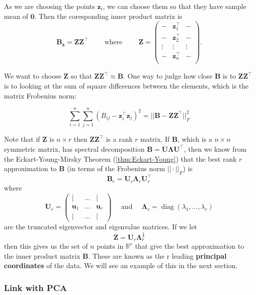 \documentclass[]{book}
\theoremstyle{definition}
\theoremstyle{definition}
\theoremstyle{definition}
\theoremstyle{remark}
\begin{document}
As we are choosing the points \(\mathbf z_i\), we can choose them so that they have sample mean of \(\boldsymbol 0\). Then the coresponding inner product matrix is
\[\mathbf B_\mathbf z= \mathbf Z\mathbf Z^\top \qquad \mbox{ where } \qquad \mathbf Z= 
\begin{pmatrix} - & \mathbf z_1^\top &-\\
 - & \mathbf z_2^\top& -\\
 \vdots & \vdots & \vdots\\
  - & \mathbf z_n^\top  &-\\
\end{pmatrix}.\]

We want to choose \(\mathbf Z\) so that \(\mathbf Z\mathbf Z^\top \approx \mathbf B\). One way to judge how close \(\mathbf B\) is to \(\mathbf Z\mathbf Z^\top\) is to looking at the sum of square differences between the elements, which is the matrix Frobenius norm:

\[\sum_{i=1}^n\sum_{j=1}^n (B_{ij}-\mathbf z_i^\top \mathbf z_j)^2 = ||\mathbf B- \mathbf Z\mathbf Z^\top||^2_F\]

Note that if \(\mathbf Z\) is \(n \times r\) then \(\mathbf Z\mathbf Z^\top\) is a rank \(r\) matrix. If \(\mathbf B\), which is a \(n\times n\) symmetric matrix, has spectral decomposition
\(\mathbf B= \mathbf U\boldsymbol \Lambda\mathbf U^\top\), then we know from the Eckart-Young-Mirsky Theorem (\ref{thm:Eckart-Young}) that the best rank \(r\) approximation to \(\mathbf B\) (in terms of the Frobenius norm \(||\cdot||_F\)) is
\[\mathbf B_r = \mathbf U_r \boldsymbol \Lambda_r \mathbf U_r^\top\]
where
\[\mathbf U_r = \begin{pmatrix} |&\ldots &|\\
\mathbf u_1 &\ldots & \mathbf u_r\\
|&\ldots &|\end{pmatrix} \quad\mbox{ and }\quad \boldsymbol \Lambda_r = \operatorname{diag}(\lambda_1, \ldots, \lambda_r)\]
are the truncated eigenvector and eigenvalue matrices.
If we let
\[\mathbf Z= \mathbf U_r \boldsymbol \Lambda_r^{\frac{1}{2}}\]
then this gives us the set of \(n\) points in \(\mathbb{R}^r\) that give the best approximation to the inner product matrix \(\mathbf B\). These are known as the r leading \textbf{principal coordinates} of the data. We will see an example of this in the next section.

\hypertarget{link-with-pca}{%
\subsubsection*{Link with PCA}\label{link-with-pca}}
\end{document}
